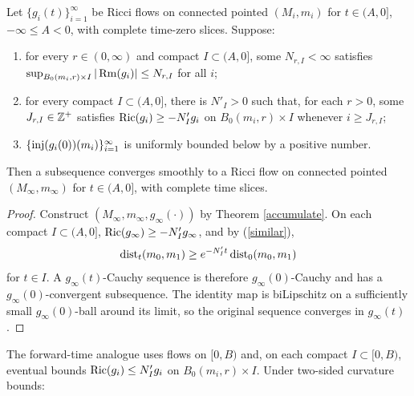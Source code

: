 \begin{corollary}
  \label{cor:kl-convergent-subsequences-ricci-flow-solutions-existence-convergent-subsequences-ricci-flow-solutions}
\label{accumulate2}

Let $\{g_i(t)\}_{i=1}^\infty$ be Ricci flows on connected pointed
$(M_i,m_i)$ for $t\in(A,0]$, $-\infty\leq A<0$, with complete time-zero
slices. Suppose:
\begin{enumerate}
\item for every $r\in(0,\infty)$ and compact $I\subset(A,0]$, some
$N_{r,I}<\infty$ satisfies
$\sup_{B_0(m_i,r)\times I}|\operatorname{Rm}(g_i)|\leq N_{r,I}$ for all $i$;
\item for every compact $I\subset(A,0]$, there is $N'_I>0$ such that, for
each $r>0$, some $J_{r,I}\in{\mathbb Z}^+$ satisfies
$\operatorname{Ric}(g_i)\geq-N'_Ig_i$ on $B_0(m_i,r)\times I$ whenever $i\geq J_{r,I}$;
\item $\{\operatorname{inj}(g_i(0))(m_i)\}_{i=1}^\infty$ is uniformly bounded below by a
positive number.
\end{enumerate}
Then a subsequence converges smoothly to a Ricci flow on connected pointed
$(M_\infty,m_\infty)$ for $t\in(A,0]$, with complete time slices.
\end{corollary}
\begin{proof}
\sketch
Construct $(M_\infty,m_\infty,g_\infty(\cdot))$ by Theorem
\ref{accumulate}. On each compact $I\subset(A,0]$,
$\operatorname{Ric}(g_\infty)\geq-N'_Ig_\infty$, and by (\ref{similar}),
\begin{equation} \label{similar2}
\operatorname{dist}_t(m_0,m_1)\geq e^{-N'_It}\operatorname{dist}_0(m_0,m_1)
\end{equation}
for $t\in I$. A $g_\infty(t)$-Cauchy sequence is therefore
$g_\infty(0)$-Cauchy and has a $g_\infty(0)$-convergent subsequence. The
identity map is biLipschitz on a sufficiently small $g_\infty(0)$-ball around
its limit, so the original sequence converges in $g_\infty(t)$.
\end{proof}

The forward-time analogue uses flows on $[0,B)$ and, on each compact
$I\subset[0,B)$, eventual bounds $\operatorname{Ric}(g_i)\leq N'_Ig_i$ on
$B_0(m_i,r)\times I$. Under two-sided curvature bounds:

